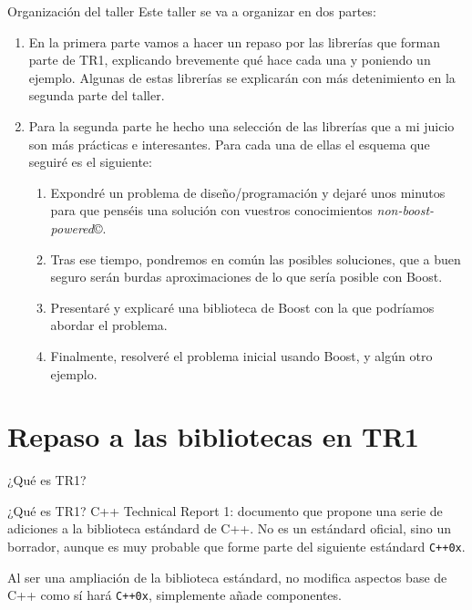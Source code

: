 \documentclass[8pt,xcolor=svgnames]{beamer}
\begin{document}
\begin{frame}{Organización del taller}
  Este taller se va a organizar en dos partes:
  \begin{enumerate}
  \item En la primera parte vamos a hacer un repaso por las librerías
    que forman parte de TR1, explicando brevemente qué hace cada una y
    poniendo un ejemplo. Algunas de estas librerías se explicarán con
    más detenimiento en la segunda parte del taller.
    \pause
  \item Para la segunda parte he hecho una selección de las librerías
    que a mi juicio son más prácticas e interesantes. Para cada una de
    ellas el esquema que seguiré es el siguiente:
    \pause
    \begin{enumerate}
    \item Expondré un problema de diseño/programación y dejaré unos
      minutos para que penséis una solución con vuestros conocimientos
      \textit{non-boost-powered}\copyright.
      \pause
    \item Tras ese tiempo, pondremos en común las posibles soluciones,
      que a buen seguro serán burdas aproximaciones de lo que sería
      posible con Boost.
      \pause
    \item Presentaré y explicaré una biblioteca de Boost con la que
      podríamos abordar el problema.
      \pause
    \item Finalmente, resolveré el problema inicial usando Boost, y
      algún otro ejemplo.
    \end{enumerate}
  \end{enumerate}
  
\end{frame}

\section{Repaso a las bibliotecas en TR1}

\begin{frame}{¿Qué es TR1?}
  \begin{block}{¿Qué es TR1?}
    C++ Technical Report 1: documento que propone una serie de
    adiciones a la biblioteca estándard de C++. No es un estándard
    oficial, sino un borrador, aunque es muy probable que forme parte
    del siguiente estándard \texttt{C++0x}.
  \end{block}
  \begin{block}{}
    Al ser una ampliación de la biblioteca estándard, no modifica
    aspectos base de C++ como sí hará \texttt{C++0x}, simplemente
    añade componentes.
  \end{block}
\end{frame}
\end{document}

